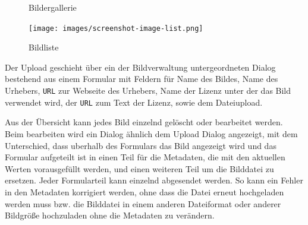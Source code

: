 \begin{figure}
  \caption{Bildergallerie}
  \label{fig:impl-image-gallery}
\end{figure}

\begin{figure}
  \centering
  \texttt{[image: images/screenshot-image-list.png]}
  \caption{Bildliste}
  \label{fig:impl-image-list}
\end{figure}

Der Upload geschieht über ein der Bildverwaltung untergeordneten Dialog
bestehend aus einem Formular mit Feldern für Name des Bildes, Name des Urhebers,
\texttt{URL} zur Webseite des Urhebers, Name der Lizenz unter der das Bild
verwendet wird, der \texttt{URL} zum Text der Lizenz, sowie dem Dateiupload.

Aus der Übersicht kann jedes Bild einzelnd gelöscht oder bearbeitet werden. Beim
bearbeiten wird ein Dialog ähnlich dem Upload Dialog angezeigt, mit dem
Unterschied, dass uberhalb des Formulars das Bild angezeigt wird und das
Formular aufgeteilt ist in einen Teil für die Metadaten, die mit den aktuellen
Werten vorausgefüllt werden, und einen weiteren Teil um die Bilddatei zu
ersetzen. Jeder Formularteil kann einzelnd abgesendet werden. So kann ein Fehler
in den Metadaten korrigiert werden, ohne dass die Datei erneut hochgeladen
werden muss bzw. die Bilddatei in einem anderen Dateiformat oder anderer
Bildgröße hochzuladen ohne die Metadaten zu verändern.

